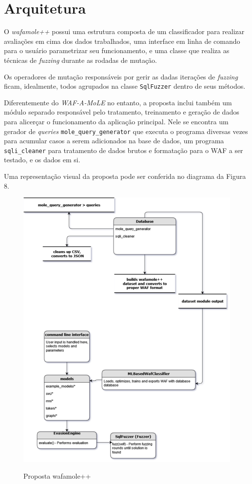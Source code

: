 \section{Arquitetura}

O \textit{wafamole++} possui uma estrutura composta de um classificador para realizar avaliações em cima dos dados trabalhados, uma interface em linha de comando para o usuário parametrizar seu funcionamento, e uma classe que realiza as técnicas de \textit{fuzzing} durante as rodadas de mutação.

Os operadores de mutação responsáveis por gerir as dadas iterações de \textit{fuzzing} ficam, idealmente, todos agrupados na classe \verb+SqlFuzzer+ dentro de seus métodos.

Diferentemente do \textit{WAF-A-MoLE} no entanto, a proposta inclui também um módulo separado responsável pelo tratamento, treinamento e geração de dados para alicerçar o funcionamento da aplicação principal. Nele se encontra um gerador de \textit{queries} \verb+mole_query_generator+ que executa o programa diversas vezes para acumular casos a serem adicionados na base de dados, um programa \verb+sqli_cleaner+ para tratamento de dados brutos e formatação para o WAF a ser testado, e os dados em si.

Uma representação visual da proposta pode ser conferida no diagrama da Figura 8.

\begin{figure}[H]
    \centering
    \caption{Proposta wafamole++}
    \includegraphics[width=16cm]{figuras/wafamole_proposal_language_agnostic.png} 
    \label{fig:internet} 
\end{figure}

